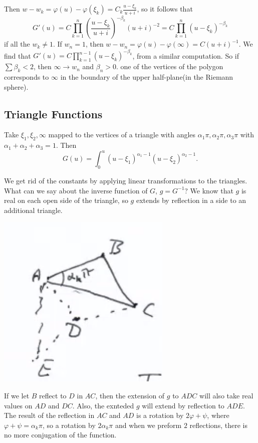 \documentclass[12pt]{scrartcl}
\let \phi \varphi
\begin{document}
Then $w - w_k = \phi(u) - \phi(\xi_k) = C_k \frac{u - \xi_k}{u + i}$, so it follows that 
$$G'(u) = C \prod_{k=1}^n \left (\frac{u - \xi_k}{u+i}\right )^{-\beta_k} (u + i)^{-2} = C \prod_{k=1}^n (u - \xi_k)^{-\beta_k}$$
if all the $w_k \ne 1$.  If $w_n = 1$, then $w - w_n = \phi(u) - \phi(\infty) = C(u + i)^{-1}$.  We find that 
$G'(u) = C \prod_{k=1}^{n-1} (u - \xi_k)^{-\beta_k}$, from a similar computation.   So if $\sum \beta_k < 2$, then $\infty \to w_n$ and $\beta_n > 0$.  one of the vertices of the polygon corresponds to $\infty$ in the boundary of the upper half-plane(in the Riemann sphere).

\subsection{Triangle Functions}
Take $\xi_1, \xi_2, \infty$ mapped to the vertices of a triangle with angles $\alpha_1 \pi, \alpha_2 \pi, \alpha_3 \pi$ with $\alpha_1 + \alpha_2 + \alpha_3 = 1$.  Then
$$G(u) = \int_{0}^u (u - \xi_1)^{\alpha_1 - 1}(u - \xi_2)^{\alpha_2 - 1}.$$

We get rid of the constants by applying linear transformations to the triangles.  What can we say about the inverse function of $G$, $g = G^{-1}$?  We know that $g$ is real on each open side of the triangle, so $g$ extends by reflection in a side to an additional triangle.  
\begin{center}
\includegraphics[scale=0.5]{triangle.png}
\end{center}
If we let $B$ reflect to $D$ in $AC$, then the extension of $g$ to $ADC$ will also take real values on $AD$ and $DC$.  Also, the exnteded $g$ will extend by reflection to $ADE$.  The result of the reflection in $AC$ and $AD$ is a rotation by $2 \phi + \psi$, where $\phi + \psi = \alpha_k \pi$, so a rotation by $2 \alpha_k \pi$ and when we preform $2$ reflections, there is no more conjugation of the function.  
\end{document}
